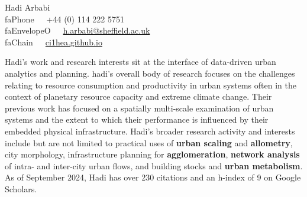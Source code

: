 \documentclass[10pt]{article}
\newcommand{\seticon}[1]{\csname #1\endcsname}
\newcommand{\makeheading}[2][]%
        {\hspace*{-\marginparsep minus \marginparwidth}%
         \begin{minipage}[t]{\textwidth+\marginparwidth+\marginparsep}%
             {\large \bfseries #2 \hfill #1}\\[-0.15\baselineskip]%
                 \rule{\columnwidth}{1pt}%
         \end{minipage}}
\renewcommand{\section}[1]{\pagebreak[3]%
    \vspace{1.3\baselineskip}%
    \phantomsection\addcontentsline{toc}{section}{#1}%
    \noindent\llap{\large\smash{\parbox[t]{\marginparwidth}{\raggedright #1}}}%
    \vspace{-\baselineskip}\par}
\providecommand*\email[1]{\href{mailto:#1}{#1}}
\begin{document}
\vspace*{25mm}
{\Huge Hadi Arbabi}\\[1cm]
\seticon{faPhone}~~~+44 (0) 114 222 5751\\
\seticon{faEnvelopeO}~~~\href{mailto:h.arbabi@sheffield.ac.uk}{h.arbabi@sheffield.ac.uk}\\
\seticon{faChain}~~~\href{https://ci1hea.github.io}{ci1hea.github.io}\\

\section{}
Hadi's work and research interests sit at the interface of data-driven urban analytics and planning. hadi’s overall body of research focuses on the challenges relating to resource consumption and productivity in urban systems often in the context of planetary resource capacity and extreme climate change. Their previous work has focused on a spatially multi-scale examination of urban systems and the extent to which their performance is influenced by their embedded physical infrastructure. Hadi's broader research activity and interests include but are not limited to practical uses of \textbf{urban scaling} and \textbf{allometry}, city morphology, infrastructure planning for \textbf{agglomeration}, \textbf{network analysis} of intra- and inter-city urban flows, and building stocks and \textbf{urban metabolism}. As of September 2024, Hadi has over 230 citations and an h-index of 9 on Google Scholars.\par
\end{document}
